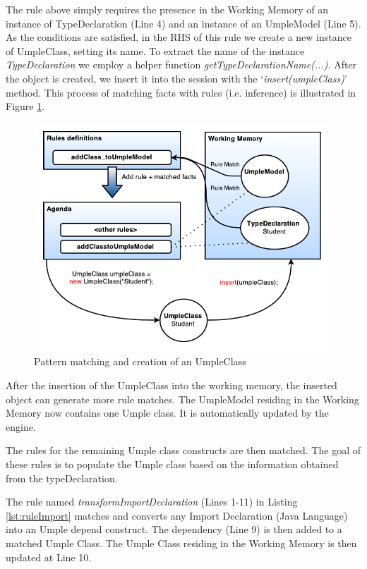 The rule above simply requires the presence in the Working Memory of an instance of TypeDeclaration (Line 4) and an instance of an UmpleModel (Line 5). As the conditions are satisfied, in the RHS of this rule we create a new instance of UmpleClass, setting its name. To extract the name of the instance \textit{TypeDeclaration} we employ a helper function \textit{getTypeDeclarationName(...)}. After the object is created, we insert it into the session with the `\textit{insert(umpleClass)}' method. This process of matching facts with rules (i.e. inference) is illustrated in Figure \ref{fig:ruleModel}.

\begin{figure}[h]
\centering
\includegraphics[width=0.98\textwidth]{Figures/ruleModel.pdf}
\caption{Pattern matching and creation of an UmpleClass}
\label{fig:ruleModel}
\end{figure}

After the insertion of the UmpleClass into the working memory, the inserted object can generate more rule matches. The UmpleModel residing in the Working Memory now contains one Umple class. It is automatically updated by the engine.

The rules for the remaining Umple class constructs are then matched. The goal of these rules is to populate the Umple class based on the information obtained from the typeDeclaration. 

The rule named \textit{transformImportDeclaration} (Lines 1-11) in Listing \ref{lst:ruleImport} matches and converts any Import Declaration (Java Language) into an Umple depend construct. The dependency (Line 9) is then added to a matched Umple Class. The Umple Class residing in the Working Memory is then updated at Line 10.

